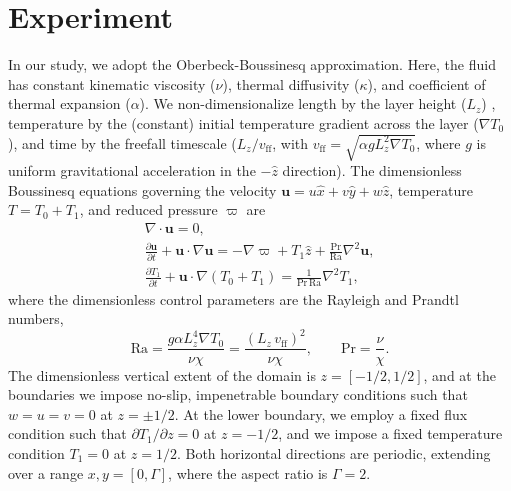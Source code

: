 \documentclass[aps, pre, onecolumn, nofootinbib, notitlepage, groupedaddress, amsfonts, amssymb, amsmath, longbibliography]{revtex4-1}
\newcommand{\DivU}{\ensuremath{\nabla\cdot\bm{u}}}
\newcommand{\grad}{\ensuremath{\nabla}}
\begin{document}
\section{Experiment}
\label{sec:experiment}
In our study, we adopt the Oberbeck-Boussinesq approximation.  Here, the
fluid has constant kinematic viscosity ($\nu$), thermal diffusivity ($\kappa$), and coefficient
of thermal expansion ($\alpha$).  We non-dimensionalize length by the layer height ($L_z$) ,
temperature by the (constant) initial temperature gradient across the layer ($\grad T_0$), and time
by the freefall timescale ($L_z / v_{\text{ff}}$, with $v_{\text{ff}} = \sqrt{\alpha g L_z^2 \grad T_0}$, where $g$ is 
uniform gravitational acceleration in the $-\hat{z}$ direction). The dimensionless Boussinesq
equations governing the velocity $\bm{u} = u\hat{x} + v\hat{y} + w\hat{z}$, temperature
$T = T_0 + T_1$, and reduced pressure $\varpi$ are \cite{spiegel&veronis1960}
\begin{gather}
\DivU = 0, 
	\label{eqn:incompressible}
\\
\frac{\partial \bm{u}}{\partial t} + \bm{u}\cdot\grad\bm{u} =
-\grad\varpi + T_1\hat{z} + \frac{\text{Pr}}{\text{Ra}}\grad^2\bm{u}, 
	\label{eqn:bouss_momentum}
\\
\frac{\partial T_1}{\partial t} + \bm{u}\cdot\grad(T_0 + T_1) = \frac{1}{\text{Pr}\,\text{Ra}}\grad^2 T_1,
	\label{eqn:bouss_energy}
\end{gather}
where the dimensionless control parameters are the Rayleigh and Prandtl numbers,
\begin{equation}
\text{Ra} = \frac{g \alpha L_z^4 \grad T_0}{\nu\chi} = \frac{(L_z\,v_{\text{ff}})^2}{\nu\chi}, \qquad \text{Pr} = \frac{\nu}{\chi}.
\end{equation}
The dimensionless vertical extent of the domain is $z = [-1/2, 1/2]$, and at the boundaries
we impose no-slip, impenetrable boundary conditions such that $w = u = v = 0$ at $z = \pm 1/2$.
At the lower boundary, we employ a fixed flux condition such that $\partial T_1 / \partial z = 0$
at $z = -1/2$, and we impose a fixed temperature condition $T_1 = 0$ at $z = 1/2$. Both
horizontal directions are periodic, extending over a range $x, y = [0, \Gamma]$, where
the aspect ratio is $\Gamma = 2$.
\end{document}
